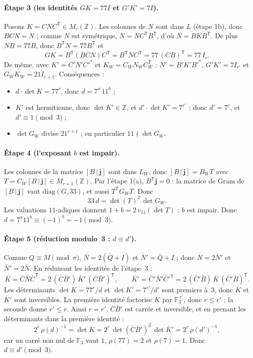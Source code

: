 \documentclass[11pt,a4paper]{article}
\theoremstyle{remark}
\newcommand{\Z}{\mathbb{Z}}
\newcommand{\F}{\mathbb{F}}
\newcommand{\one}{\mathbf{j}}
\begin{document}
\paragraph{Étape 3 (les identités $GK=77I$ et $G'K'=7I$).}
Posons $K=CNC^{\mathsf T}\in M_r(\Z)$. Les colonnes de $N$ sont dans $L$ (étape 1b), donc $BCN=N$ ; comme $N$ est symétrique,
$N=NC^{\mathsf T}B^{\mathsf T}$, d'où $N=BKB^{\mathsf T}$. De plus $NB=77B$, donc $B^{\mathsf T}N=77B^{\mathsf T}$ et
\[
GK=B^{\mathsf T}(BCN)C^{\mathsf T}=B^{\mathsf T}NC^{\mathsf T}=77\,(CB)^{\mathsf T}=77\,I_r .
\]
De même, avec $K'=C'N'C'^*$ et $K_W=C_WN_WC_W^{\mathsf T}$ : $N'=B'K'B'^*$, $G'K'=7I_{r'}$ et $G_WK_W=21I_{r+1}$. Conséquences :
\begin{itemize}[nosep]
\item $d\cdot\det K=77^r$, donc $d=7^a\,11^b$ ;
\item $K'$ est hermitienne, donc $\det K'\in\Z$, et $d'\cdot\det K'=7^{r'}$ ; donc $d'=7^c$, et $d'\equiv 1\pmod 3$ ;
\item $\det G_W$ divise $21^{r+1}$ ; en particulier $11\nmid\det G_W$.
\end{itemize}

\paragraph{Étape 4 (l'exposant $b$ est impair).}
Les colonnes de la matrice $[B\,|\,\one]$ sont dans $L_W$, donc $[B\,|\,\one]=B_WT$ avec $T=C_W[B\,|\,\one]\in M_{r+1}(\Z)$.
Par l'étape 1(a), $B^{\mathsf T}\one=0$ : la matrice de Gram de $[B\,|\,\one]$ vaut $\mathrm{diag}(G,33)$, et aussi
$T^{\mathsf T}G_WT$. Donc
\[
33\,d=\det(T)^2\,\det G_W .
\]
Les valuations $11$-adiques donnent $1+b=2\,v_{11}(\det T)$ : $b$ est impair. Donc $d=7^a11^b\equiv(-1)^b=-1\pmod 3$.

\paragraph{Étape 5 (réduction modulo~3 : $d\equiv d'$).}
Comme $Q\equiv M\pmod\pi$, $\bar N=2(\bar Q+I)$ et $\bar N'=\bar Q+I$ ; donc $\bar N=2\bar N'$ et $\bar N'=2\bar N$. En réduisant les
identités de l'étape~3 :
\[
\bar K=\bar C\bar N\bar C^{\mathsf T}=2\,(\bar C\bar B')\,\bar K'\,(\bar C\bar B')^{\mathsf T},\qquad
\bar K'=\bar C'\bar N'\bar C'^{\mathsf T}=2\,(\bar C'\bar B)\,\bar K\,(\bar C'\bar B)^{\mathsf T}.
\]
Les déterminants $\det K=77^r/d$ et $\det K'=7^{r'}/d'$ sont premiers à~3, donc $\bar K$ et $\bar K'$ sont inversibles. La première
identité factorise $\bar K$ par $\F_3^{\,r'}$, donc $r\le r'$ ; la seconde donne $r'\le r$. Ainsi $r=r'$, $\bar C\bar B'$ est carrée
et inversible, et en prenant les déterminants dans la première identité :
\[
2^r\,\rho(d)^{-1}=\det\bar K=2^r\,\det(\bar C\bar B')^2\,\det\bar K'=2^r\,\rho(d')^{-1},
\]
car un carré non nul de $\F_3$ vaut $1$, $\rho(77)=2$ et $\rho(7)=1$. Donc $d\equiv d'\pmod 3$.
\end{document}
